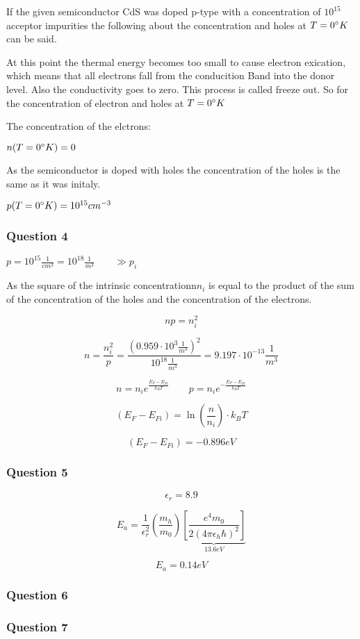 If the given semiconductor CdS was doped p-type with a
concentration of $10^{15}$ acceptor impurities the following
about the concentration and holes at $T=0\degree K$ can be said.

At this point the thermal energy becomes too small to cause electron exication, which means that all electrons fall from
the conducition Band into the donor level. Also the conductivity
goes to zero. This process is called freeze out. 
So for the concentration of electron and holes at $T=0 \degree K$

The concentration of the elctrons:

$n(T=0 \degree K) = 0$

As the semiconductor is doped with holes the concentration of the
holes is the same as it was initaly.

$p(T=0 \degree K) = 10^{15}cm^{-3}$


\subsubsection*{Question 4}

$p = 10^{15} \frac{1}{cm^3} = 10^{18} \frac{1}{m^3} \qquad \gg p_i$

As the square of the intrinsic concentrationn$n_i$ is equal to the product
of the sum of the concentration of the holes and the concentration of the
electrons.

$$np = n_i^2$$

$$n = \frac{n_i^2}{p} = \frac{(0.959 \cdot 10^3 \frac{1}{m^3})^2}{10^{18} \frac{1}{m^3}} = 9.197 \cdot 10^{-13} \frac{1}{m^3}$$

$$n = n_i e^{\frac{E_F-E_{Fi}}{k_BT}}  \qquad p = n_i e^{-\frac{E_F-E_{Fi}}{k_BT}}$$

$$(E_F-E_{Fi}) = \ln\left( \frac{n}{n_i} \right) \cdot k_BT$$

$$(E_F-E_{Fi}) = -0.896 eV $$

\subsubsection*{Question 5}

$$\epsilon_r = 8.9$$


$$
E_a = \frac{1}{\epsilon_r^2} \left(\frac{m_h}{m_0}\right) \underbrace{\left[\frac{e^4m_0}{2(4\pi\epsilon_h\hbar)^2}\right]}_{13.6eV}
$$

$$E_a =  0.14eV$$

\subsubsection*{Question 6}

\subsubsection*{Question 7}